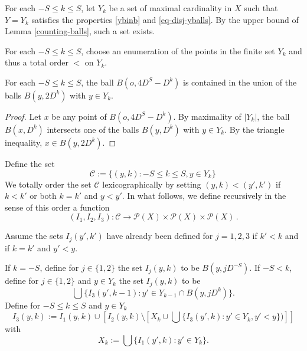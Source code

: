 For each $-S\le k\le S$, let $Y_k$ be a set of
maximal cardinality in $X$ such that $Y=Y_k$ satisfies
the properties \eqref{ybinb} and \eqref{eq-disj-yballs}.
By the upper bound of Lemma \ref{counting-balls}, such a set exists.

For each $-S\le k\le S$, choose an enumeration of the points in the finite set $Y_k$ and thus a total
order  $<$ on $Y_{k}$.

\begin{lemma}
\label{cover-big-ball}
  For each $-S\le k\le S$, the ball
  $B(o, 4D^S-D^k)$ is contained
  in the union of the balls $B(y,2D^k)$ with $y\in Y_k$.
\end{lemma}

\begin{proof}
Let $x$ be any point of $B(o, 4D^S-D^k)$.   By maximality of $|Y_k|$, the ball
$B(x,  D^k)$ intersects one of the balls
$B(y,  D^k)$ with $y\in Y_k$. By the triangle
inequality, $x\in B(y,2D^k)$.
\end{proof}

Define the set
\begin{equation}
    \mathcal{C}:= \{(y,k): -S\le k\le S, y\in Y_k\}\,
\end{equation}
We totally order the set $\mathcal{C}$ lexicographically by setting
$(y,k)<(y',k')$ if $k< k'$ or both $k=k'$ and $y<y'$.
In what follows, we define recursively in the sense of this order a function
\begin{equation}
    (I_1,I_2,I_3): \mathcal{C}\to \mathcal{P}(X)\times \mathcal{P}(X)\times \mathcal{P}(X)\, .
\end{equation}


Assume the sets ${I}_j(y',k')$ have already been defined  for $j=1,2,3$ if $k'<k$ and if  $k=k'$ and $y'<y$.




If $k=-S$, define for  $j\in \{1,2\}$ the set
${I}_j(y,k)$ to be $B(y,jD^{-S})$.
If $-S<k$, define for $j\in \{1,2\}$
and $y\in Y_k$ the set ${I}_j(y,k)$ to be
\begin{equation}\label{defineij}
\bigcup\{I_3(y',k-1):
y'\in Y_{k-1}\cap  B(y,jD^k)\}.
\end{equation}
Define for {$-S\leq k\leq S$} and $y\in Y_k$
\begin{equation}\label{definei3}
I_3(y,k):={I_1}(y,k)\cup \left[{I_2}(y,k)\setminus \left[X_k\cup \bigcup\{I_3(y',k):y'\in Y_{k}, y'<y\})\right]\right]
\end{equation}
with
\begin{equation}
      X_{k}:=\bigcup\{I_1(y', k):y'\in Y_{k}\}.
\end{equation}


